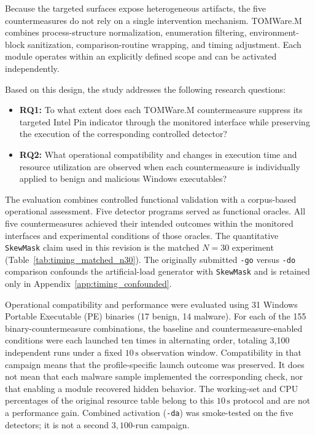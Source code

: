 \documentclass[pdflatex,sn-mathphys-num]{sn-jnl}
\theoremstyle{thmstyleone}
\theoremstyle{thmstyletwo}
\theoremstyle{thmstylethree}
\begin{document}
Because the targeted surfaces expose heterogeneous artifacts, the five countermeasures do not rely on a single intervention mechanism. TOMWare.M combines process-structure normalization, enumeration filtering, environment-block sanitization, comparison-routine wrapping, and timing adjustment. Each module operates within an explicitly defined scope and can be activated independently.

Based on this design, the study addresses the following research questions:

\begin{itemize}
    \item \textbf{RQ1:} To what extent does each TOMWare.M countermeasure suppress its targeted Intel Pin indicator through the monitored interface while preserving the execution of the corresponding controlled detector?
    \item \textbf{RQ2:} What operational compatibility and changes in execution time and resource utilization are observed when each countermeasure is individually applied to benign and malicious Windows executables?
\end{itemize}

The evaluation combines controlled functional validation with a corpus-based operational assessment. Five detector programs served as functional oracles. All five countermeasures achieved their intended outcomes within the monitored interfaces and experimental conditions of those oracles. The quantitative \texttt{SkewMask} claim used in this revision is the matched $N=30$ experiment (Table~\ref{tab:timing_matched_n30}). The originally submitted \texttt{-go} versus \texttt{-do} comparison confounds the artificial-load generator with \texttt{SkewMask} and is retained only in Appendix~\ref{app:timing_confounded}.

Operational compatibility and performance were evaluated using 31 Windows Portable Executable (PE) binaries (17 benign, 14 malware). For each of the 155 binary-countermeasure combinations, the baseline and countermeasure-enabled conditions were each launched ten times in alternating order, totaling 3,100 independent runs under a fixed $10\,\mathrm{s}$ observation window. Compatibility in that campaign means that the profile-specific launch outcome was preserved. It does not mean that each malware sample implemented the corresponding check, nor that enabling a module recovered hidden behavior. The working-set and CPU percentages of the original resource table belong to this $10\,\mathrm{s}$ protocol and are not a performance gain. Combined activation (\texttt{-da}) was smoke-tested on the five detectors; it is not a second $3{,}100$-run campaign.
\end{document}
